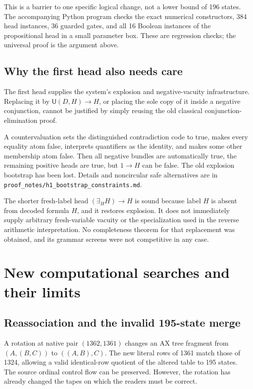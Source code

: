 \documentclass[11pt,a4paper]{article}
\newcommand{\UU}{\mathsf{U}}
\newcommand{\code}[1]{\nolinkurl{#1}}
\begin{document}
This is a barrier to one specific logical change, not a lower bound of 196 states. The accompanying Python program checks the exact numerical constructors, 384 head instances, 36 guarded gates, and all 16 Boolean instances of the propositional head in a small parameter box. These are regression checks; the universal proof is the argument above.

\subsection{Why the first head also needs care}

The first head supplies the system's explosion and negative-vacuity infrastructure. Replacing it by $\UU(D,H)\to H$, or placing the sole copy of it inside a negative conjunction, cannot be justified by simply reusing the old classical conjunction-elimination proof.

A countervaluation sets the distinguished contradiction code to true, makes every equality atom false, interprets quantifiers as the identity, and makes some other membership atom false. Then all negative bundles are automatically true, the remaining positive heads are true, but $1\to H$ can be false. The old explosion bootstrap has been lost. Details and noncircular safe alternatives are in \code{proof_notes/h1_bootstrap_constraints.md}.

The shorter fresh-label head $(\exists_H H)\to H$ is sound because label $H$ is absent from decoded formula $H$, and it restores explosion. It does not immediately supply arbitrary fresh-variable vacuity or the specialization used in the reverse arithmetic interpretation. No completeness theorem for that replacement was obtained, and its grammar screens were not competitive in any case.

\section{New computational searches and their limits}

\subsection{Reassociation and the invalid 195-state merge}

A rotation at native pair $(1362,1361)$ changes an AX tree fragment from
$(A,(B,C))$ to $((A,B),C)$. The new literal rows of 1361 match those of 1324, allowing a valid identical-row quotient of the altered table to 195 states. The source ordinal control flow can be preserved. However, the rotation has already changed the tapes on which the readers must be correct.
\end{document}
